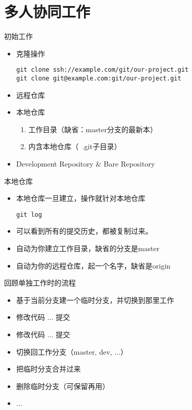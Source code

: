 \part{多人协同工作}
\begin{frame}[<+->][fragile]{初始工作}
\begin{itemize}
  \item 克隆操作
\begin{Verbatim}[frame=single,commandchars=\\\{\}]
git clone ssh://example.com/git/our-project.git
git clone git@example.com:git/our-project.git
\end{Verbatim}
  \item 远程仓库
  \item 本地仓库
  \begin{enumerate}
    \item 工作目录（缺省：master分支的最新本）
    \item 内含本地仓库（\ .git子目录）
  \end{enumerate}
  \item Development Repository \& Bare Repository
\end{itemize}
\end{frame}

\begin{frame}[<+->][fragile]{本地仓库}
\begin{itemize}
  \item 本地仓库一旦建立，操作就针对本地仓库
\begin{Verbatim}[frame=single,commandchars=\\\{\}]
git log
\end{Verbatim}
  \item 可以看到所有的提交历史，都被复制过来。
  \item 自动为你建立工作目录，缺省的分支是master
  \item 自动为你的远程仓库，起一个名字，缺省是origin
\end{itemize}
\end{frame}

\begin{frame}[<+->][fragile]{回顾单独工作时的流程}
    \begin{itemize}
        \item 基于当前分支建一个临时分支，并切换到那里工作
        \item 修改代码 \(\ldots\) 提交
        \item 修改代码 \(\ldots\) 提交
        \item 切换回工作分支（master, dev, \(\ldots\)）
        \item 把临时分支合并过来
        \item 删除临时分支（可保留再用）
        \item \(\ldots\)
    \end{itemize}
\end{frame}

